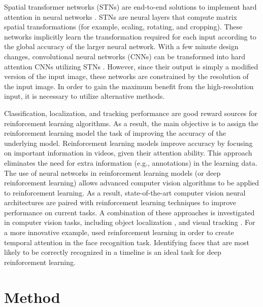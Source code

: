 \documentclass[review]{elsarticle}
\begin{document}
Spatial transformer networks (STNs) are end-to-end solutions to implement hard attention in neural networks \citep{jaderberg2015spatial}. STNs are neural layers that compute matrix spatial transformations (for example, scaling, rotating, and cropping). These networks implicitly learn the transformation required for each input according to the global accuracy of the larger neural network. With a few minute design changes, convolutional neural networks (CNNs) can be transformed into hard attention CNNs utilizing STNs \citep{li2018harmonious, malinowski2018learning}. However, since their output is simply a modified version of the input image, these networks are constrained by the resolution of the input image. In order to gain the maximum benefit from the high-resolution input, it is necessary to utilize alternative methods.

Classification, localization, and tracking performance are good reward sources for reinforcement learning algorithms. As a result, the main objective is to assign the reinforcement learning model the task of improving the accuracy of the underlying model. Reinforcement learning models improve accuracy by focusing on important information in videos, given their attention ability. This approach eliminates the need for extra information (e.g., annotations) in the learning data. The use of neural networks in reinforcement learning models (or deep reinforcement learning) allows advanced computer vision algorithms to be applied to reinforcement learning. As a result, state-of-the-art computer vision neural architectures are paired with reinforcement learning techniques to improve performance on current tasks. A combination of these approaches is investigated in computer vision tasks, including object localization \citep{wang2018multitask, jie2016tree, caicedo2015active, mathe2016reinforcement}, and visual tracking \citep{luo2019end, ren2018collaborative, yun2018action, zhong2019decision, cui2021remote}. For a more innovative example, \citet{rao2017attention} used reinforcement learning in order to create temporal attention in the face recognition task. Identifying faces that are most likely to be correctly recognized in a timeline is an ideal task for deep reinforcement learning.






\section{Method}
\label{method}
\end{document}
